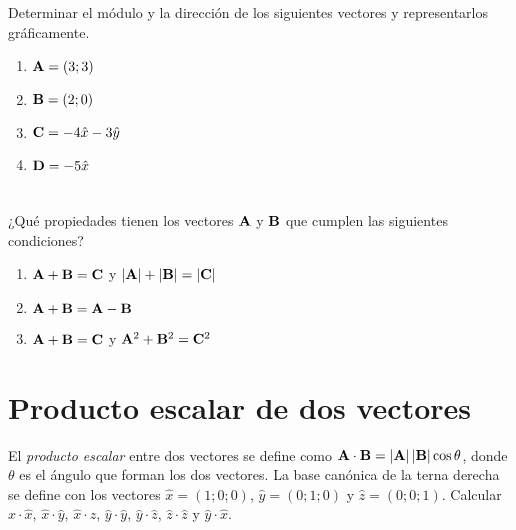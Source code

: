 \documentclass[a4paper, 12pt, fleqn]{article}
\begin{document}
\section{}

Determinar el módulo y la dirección de los siguientes vectores y representarlos gráficamente.
\begin{enumerate}[label=(\alph*)]
    \item ${\bf A} = (3; 3) $
    \item ${\bf B} = (2; 0) $
    \item ${\bf C} = -4 \hat{x} - 3 \hat{y} $
    \item ${\bf D} = -5 \hat{x} $
\end{enumerate}

\section{}

¿Qué propiedades tienen los vectores ${\bf A}$ y ${\bf B}$ que cumplen las siguientes condiciones?
\begin{enumerate}[label=(\alph*)]
    \item ${\bf A} + {\bf B} = {\bf C} $ y $\left| {\bf A} \right| + \left| {\bf B} \right| = \left| {\bf C} \right| $
    \item ${\bf A} + {\bf B} = {\bf A} - {\bf B} $
    \item ${\bf A} + {\bf B} = {\bf C} $ y ${\bf A}^2 + {\bf B}^2 = {\bf C}^2 $
\end{enumerate}

\section{Producto escalar de dos vectores}
\label{ref:prod_escalar}

El {\it producto escalar} entre dos vectores se define como ${\bf A} \cdot {\bf B} = \left| {\bf A} \right| \left| {\bf B} \right| \cos \theta$, donde $\theta$ es el ángulo que forman los dos vectores. La base canónica de la terna derecha se define con los vectores $\hat{x} = (1;0;0)$, $\hat{y} = (0;1;0)$ y $\hat{z} = (0;0;1)$. Calcular $\hat{x} \cdot \hat{x}$, $\hat{x} \cdot \hat{y}$, $\hat{x} \cdot \hat{z}$, $\hat{y} \cdot \hat{y}$, $\hat{y} \cdot \hat{z}$, $\hat{z} \cdot \hat{z}$ y $\hat{y} \cdot \hat{x}$.

\section{}
\end{document}
